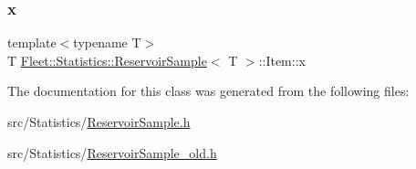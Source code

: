 \mbox{\label{class_fleet_1_1_statistics_1_1_reservoir_sample_1_1_item_ae845a0d698a99e1508241fd25b63dd3a}} 
\subsubsection{\texorpdfstring{x}{x}}
{\footnotesize\ttfamily template$<$typename T$>$ \\
T \hyperlink{class_fleet_1_1_statistics_1_1_reservoir_sample}{Fleet\+::\+Statistics\+::\+Reservoir\+Sample}$<$ T $>$\+::Item\+::x}



The documentation for this class was generated from the following files\+:\begin{DoxyCompactItemize}
\item 
src/\+Statistics/\hyperlink{_reservoir_sample_8h}{Reservoir\+Sample.\+h}\item 
src/\+Statistics/\hyperlink{_reservoir_sample__old_8h}{Reservoir\+Sample\+\_\+old.\+h}\end{DoxyCompactItemize}
